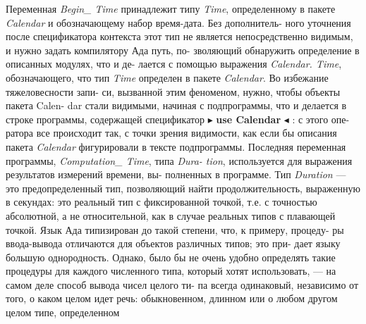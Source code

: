 Переменная {\it Begin\_ Time} принадлежит типу {\it Time}, определенному в\linebreak
пакете {\it Calendar} и обозначающему набор время-дата. Без дополнитель­-\linebreak
ного уточнения после спецификатора контекста этот тип не является\linebreak
непосредственно видимым, и нужно задать компилятору Ада путь, по­-\linebreak
зволяющий обнаружить определение в описанных модулях, что и де­-\linebreak
лается с помощью выражения {\it Calendar. Time}, обозначающего, что тип\linebreak
{\it Time} определен в пакете {\it Calendar}. Во избежание тяжеловесности запи­-\linebreak
си, вызванной этим феноменом, нужно, чтобы объекты пакета Calen­-\linebreak
dar стали видимыми, начиная с подпрограммы, что и делается в строке\linebreak
программы, содержащей спецификатор $\blacktriangleright$ {\bf use Calendar }$\blacktriangleleft$ : с этого опе-\linebreak
ратора все происходит так, с точки зрения видимости, как если бы\linebreak
описания пакета {\it Calendar} фигурировали в тексте подпрограммы.\linebreak
Последняя переменная программы, {\it Computation\_ Time}, типа {\it Dura­-\linebreak
tion}, используется для выражения результатов измерений времени, вы­-\linebreak
полненных в программе. Тип {\it Duration} — это предопределенный тип,\linebreak
позволяющий найти продолжительность, выраженную в секундах: это\linebreak
реальный тип с фиксированной точкой, т.е. с точностью абсолютной,\linebreak
а не относительной, как в случае реальных типов с плавающей точкой.\linebreak
Язык Ада типизирован до такой степени, что, к примеру, процеду­-\linebreak
ры ввода-вывода отличаются для объектов различных типов; это при­-\linebreak
дает языку большую однородность. Однако, было бы не очень удобно\linebreak
определять такие процедуры для каждого численного типа, который\linebreak
хотят использовать, — на самом деле способ вывода чисел целого ти­-\linebreak
па всегда одинаковый, независимо от того, о каком целом идет речь:\linebreak
обыкновенном, длинном или о любом другом целом типе, определенном\linebreak


